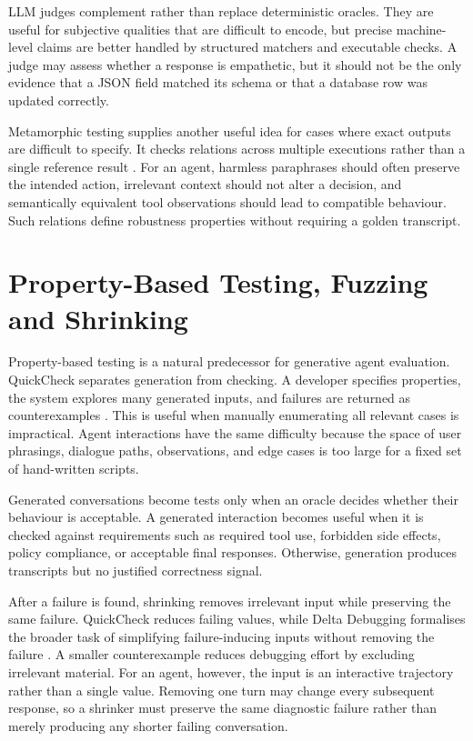 LLM judges complement rather than replace deterministic oracles. They are useful for subjective qualities that are difficult to encode, but precise machine-level claims are better handled by structured matchers and executable checks. A judge may assess whether a response is empathetic, but it should not be the only evidence that a JSON field matched its schema or that a database row was updated correctly.

Metamorphic testing supplies another useful idea for cases where exact outputs are difficult to specify. It checks relations across multiple executions rather than a single reference result \citep{chen1998metamorphic}. For an agent, harmless paraphrases should often preserve the intended action, irrelevant context should not alter a decision, and semantically equivalent tool observations should lead to compatible behaviour. Such relations define robustness properties without requiring a golden transcript.

\section{Property-Based Testing, Fuzzing and Shrinking}
\label{sec:bg-testing-lineage}

Property-based testing is a natural predecessor for generative agent evaluation. QuickCheck separates generation from checking. A developer specifies properties, the system explores many generated inputs, and failures are returned as counterexamples \citep{claessen2000quickcheck}. This is useful when manually enumerating all relevant cases is impractical. Agent interactions have the same difficulty because the space of user phrasings, dialogue paths, observations, and edge cases is too large for a fixed set of hand-written scripts.

Generated conversations become tests only when an oracle decides whether their behaviour is acceptable. A generated interaction becomes useful when it is checked against requirements such as required tool use, forbidden side effects, policy compliance, or acceptable final responses. Otherwise, generation produces transcripts but no justified correctness signal.

After a failure is found, shrinking removes irrelevant input while preserving the same failure. QuickCheck reduces failing values, while Delta Debugging formalises the broader task of simplifying failure-inducing inputs without removing the failure \citep{zeller2002simplifying}. A smaller counterexample reduces debugging effort by excluding irrelevant material. For an agent, however, the input is an interactive trajectory rather than a single value. Removing one turn may change every subsequent response, so a shrinker must preserve the same diagnostic failure rather than merely producing any shorter failing conversation.

